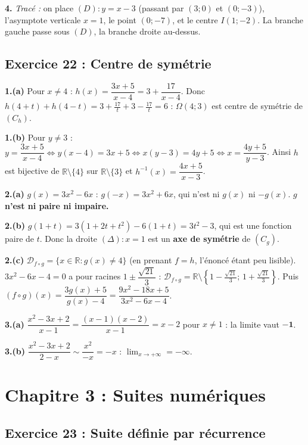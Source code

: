 \documentclass[11pt,a4paper]{article}
\newcommand{\R}{\mathbb{R}}
\begin{document}
\textbf{4.} \emph{Trac\'e :} on place $(D):y=x-3$ (passant par $(3;0)$ et $(0;-3)$), l'asymptote verticale $x=1$, le point $(0;-7)$,
et le centre $I(1;-2)$. La branche gauche passe sous $(D)$, la branche droite au-dessus.

\subsection{Exercice 22 : Centre de sym\'etrie}

\textbf{1.(a)} Pour $x\neq4$ : $h(x)=\dfrac{3x+5}{x-4}=3+\dfrac{17}{x-4}$. Donc $h(4+t)+h(4-t)=3+\frac{17}{t}+3-\frac{17}{t}=6$ :
$\Omega(4;3)$ est centre de sym\'etrie de $(C_h)$.

\textbf{1.(b)} Pour $y\neq3$ : $y=\dfrac{3x+5}{x-4}\iff y(x-4)=3x+5\iff x(y-3)=4y+5\iff x=\dfrac{4y+5}{y-3}$.
Ainsi $h$ est bijective de $\R\setminus\{4\}$ sur $\R\setminus\{3\}$ et
$\boxed{h^{-1}(x)=\dfrac{4x+5}{x-3}}$.

\textbf{2.(a)} $g(x)=3x^2-6x$ : $g(-x)=3x^2+6x$, qui n'est ni $g(x)$ ni $-g(x)$. \textbf{$g$ n'est ni paire ni impaire.}

\textbf{2.(b)} $g(1+t)=3(1+2t+t^2)-6(1+t)=3t^2-3$, qui est une fonction paire de $t$. Donc la droite $(\Delta):x=1$
est un \textbf{axe de sym\'etrie} de $(C_g)$.

\textbf{2.(c)} $\mathcal D_{f\circ g}=\{x\in\R : g(x)\neq4\}$ (en prenant $f=h$, l'\'enonc\'e \'etant peu lisible).
$3x^2-6x-4=0$ a pour racines $1\pm\dfrac{\sqrt{21}}{3}$ :
$\mathcal D_{f\circ g}=\R\setminus\left\{1-\tfrac{\sqrt{21}}{3};\,1+\tfrac{\sqrt{21}}{3}\right\}$.
Puis $(f\circ g)(x)=\dfrac{3g(x)+5}{g(x)-4}=\dfrac{9x^2-18x+5}{3x^2-6x-4}$.

\textbf{3.(a)} $\dfrac{x^2-3x+2}{x-1}=\dfrac{(x-1)(x-2)}{x-1}=x-2$ pour $x\neq1$ : la limite vaut $\mathbf{-1}$.

\textbf{3.(b)} $\dfrac{x^2-3x+2}{2-x}\sim\dfrac{x^2}{-x}=-x$ : $\lim_{x\to+\infty}=\mathbf{-\infty}$.

\section{Chapitre 3 : Suites num\'eriques}

\subsection{Exercice 23 : Suite d\'efinie par r\'ecurrence}
\end{document}
